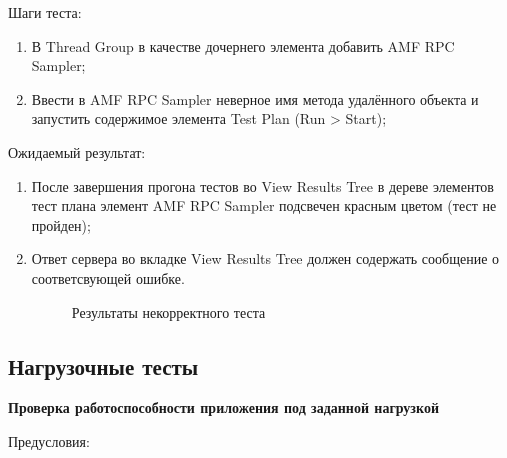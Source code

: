 Шаги теста:

\begin{enumerate}
\item В Thread Group в качестве дочернего элемента добавить AMF RPC Sampler;
\item Ввести в AMF RPC Sampler неверное имя метода удалённого объекта и запустить содержимое элемента Test Plan (Run > Start);
\end{enumerate}

Ожидаемый результат:

\begin{enumerate}
\item После завершения прогона тестов во View Results Tree в дереве элементов тест плана элемент AMF RPC Sampler
подсвечен красным цветом (тест не пройден);
\item Ответ сервера во вкладке View Results Tree должен содержать сообщение о соответсвующей ошибке.

\begin{figure}[ht]
\caption{Результаты некорректного теста}
\label{ris:negativeTest.png}
\end{figure}

\end{enumerate}

\subsection{Нагрузочные тесты}

{\bfseries Проверка работоспособности приложения под заданной нагрузкой}

Предусловия:

